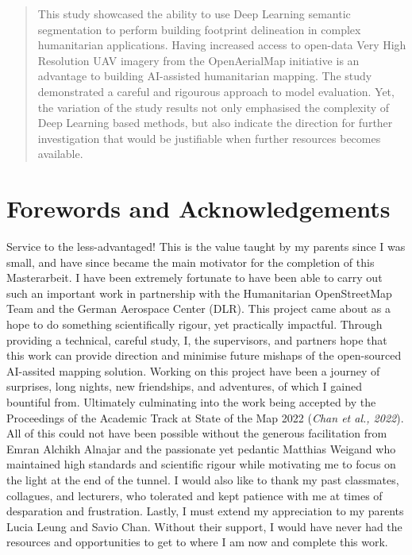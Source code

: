 \documentclass[11pt, a4paper, twoside]{report}
\begin{document}
\begin{abstract}
This study showcased the ability to use Deep Learning semantic segmentation to perform building footprint delineation in complex humanitarian applications. Having increased access to open-data Very High Resolution UAV imagery from the OpenAerialMap initiative is an advantage to building AI-assisted humanitarian mapping. The study demonstrated a careful and rigourous approach to model evaluation. Yet, the variation of the study results not only emphasised the complexity of Deep Learning based methods, but also indicate the direction for further investigation that would be justifiable when further resources becomes available.\\\par

\end{abstract}

\newpage

\section{Forewords and Acknowledgements}

Service to the less-advantaged! This is the value taught by my parents since I was small, and have since became the main motivator for the completion of this Masterarbeit. I have been extremely fortunate to have been able to carry out such an important work in partnership with the Humanitarian OpenStreetMap Team and the German Aerospace Center (DLR). This project came about as a hope to do something scientifically rigour, yet practically impactful. Through providing a technical, careful study, I, the supervisors, and partners hope that this work can provide direction and minimise future mishaps of the open-sourced AI-assited mapping solution. Working on this project have been a journey of surprises, long nights, new friendships, and adventures, of which I gained bountiful from. Ultimately culminating into the work being accepted by the Proceedings of the Academic Track at State of the Map 2022 (\textit{Chan et al., 2022}). All of this could not have been possible without the generous facilitation from Emran Alchikh Alnajar and the passionate yet pedantic Matthias Weigand who maintained high standards and scientific rigour while motivating me to focus on the light at the end of the tunnel. I would also like to thank my past classmates, collagues, and lecturers, who tolerated and kept patience with me at times of desparation and frustration. Lastly, I must extend my appreciation to my parents Lucia Leung and Savio Chan. Without their support, I would have never had the resources and opportunities to get to where I am now and complete this work.
\end{document}
